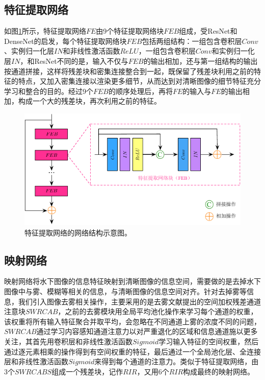 \subsection{特征提取网络}

如图\ref{FE}所示，特征提取网络$FE$由9个特征提取网络块$FEB$组成，受ResNet\cite{he2016deep}和DenseNet\cite{huang2017densely}的启发，每个特征提取网络块$FEB$包括两组结构：一组包含卷积层$Conv$、实例归一化层$IN$\cite{ulyanov2016instance}和非线性激活函数$ReLU$\cite{nair2010rectified}，一组包含卷积层$Conv$和实例归一化层$IN$，和ResNet不同的是，输入不仅与$FEB$的输出相加，还与第一组结构的输出按通道拼接，这样将残差块和密集连接整合到一起，既保留了残差块利用之前的特征的特点，又加入密集连接以渲染更多细节，从而达到对清晰图像的细节特征充分学习和整合的目的。经过9个$FEB$的顺序处理后，再将$FE$的输入与$FE$的输出相加，构成一个大的残差块，再次利用之前的特征。

\begin{figure}[ht]
    \centering
	\includegraphics[width=\textwidth]{figs/FE.pdf}
	\caption{特征提取网络的网络结构示意图。}
	\label{FE}
\end{figure}

\subsection{映射网络}

映射网络将水下图像的信息特征映射到清晰图像的信息空间，需要做的是去掉水下图像中与雾、模糊等相关的信息，与清晰图像的信息空间对齐。针对去掉雾等信息，我们引入图像去雾相关操作，主要采用的是去雾文献\cite{hong2020distilling}提出的空间加权残差通道注意块$SWRCAB$，之前的去雾模块用全局平均池化操作来学习每个通道的权重，该权重将所有输入特征聚合并取平均，会忽略在不同通道上雾的浓度不同的问题，$SWRCAB$通过学习内容感知通道注意力以对严重退化的区域和信息通道施以更多关注，其首先用卷积层和非线性激活函数$Sigmoid$学习输入特征的空间权重，然后通过逐元素相乘的操作得到有空间权重的特征，最后通过一个全局池化层、全连接层和非线性激活函数$Sigmoid$来得到每个通道的注意力。类似于特征提取网络，由3个$SWRCABS$组成一个残差块，记作$RIR$，又用6个$RIR$构成最终的映射网络。

